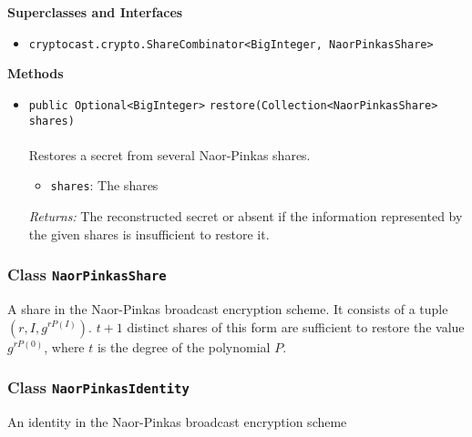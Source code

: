 \textbf{\sffamily Superclasses and Interfaces}
\begin{itemize}
\item \lstinline|cryptocast.crypto.ShareCombinator<BigInteger, NaorPinkasShare>|
\end{itemize}



\textbf{\sffamily Methods}
\begin{itemize}
\item \lstinline|public Optional<BigInteger>| \lstinline|restore|\lstinline|(Collection<NaorPinkasShare> shares)|\\ \\[-0.6em]
Restores a secret from several Naor-Pinkas shares.
\begin{itemize}
\item \lstinline|shares|: The shares
\end{itemize}

\emph{Returns:} The reconstructed secret or absent if the information represented
 by the given shares is insufficient to restore it.

\end{itemize}

\subsubsection{Class \lstinline|NaorPinkasShare|}
A share in the Naor-Pinkas broadcast encryption scheme. It consists of a tuple
 $(r, I, g^{r P(I)})$. $t + 1$ distinct shares of this form are sufficient to restore the
 value $g^{r P(0)}$, where $t$ is the degree of the polynomial $P$. \\
\noindent\begin{minipage}[t]{5cm}
\vspace{0.3em}
\hspace*{2em}
\vspace{0.3em}
\end{minipage}





\subsubsection{Class \lstinline|NaorPinkasIdentity|}
An identity in the Naor-Pinkas broadcast encryption scheme \\
\noindent\begin{minipage}[t]{5cm}
\vspace{0.3em}
\hspace*{2em}
\vspace{0.3em}
\end{minipage}




